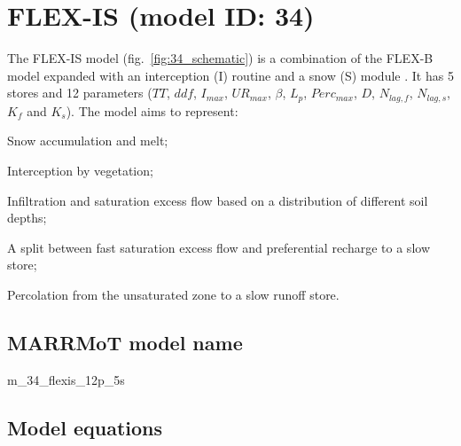 \section{FLEX-IS (model ID: 34)}
The FLEX-IS model (fig.~\ref{fig:34_schematic}) is a combination of the FLEX-B model expanded with an interception (I) routine \citep{Fenicia2008} and a snow (S) module \citep{Nijzink2016}. It has 5 stores and 12 parameters ($TT$, $ddf$, $I_{max}$, $UR_{max}$, $\beta$, $L_p$, $Perc_{max}$, $D$, $N_{lag,f}$, $N_{lag,s}$, $K_f$ and $K_s$). The model aims to represent:

\begin{itemizecompact}
\item Snow accumulation and melt;
\item Interception by vegetation;
\item Infiltration and saturation excess flow based on a distribution of different soil depths;
\item A split between fast saturation excess flow and preferential recharge to a slow store;
\item Percolation from the unsaturated zone to a slow runoff store.
\end{itemizecompact}

\subsection{MARRMoT model name}
m\_34\_flexis\_12p\_5s \\

\subsection{Model equations}

